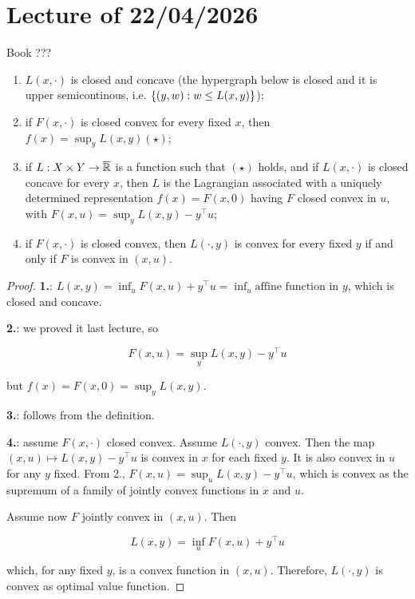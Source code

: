\chapter{Lecture \thechapter{} of 22/04/2026}

\begin{theorem}{Book ???}
    
    \begin{enumerate}
        \item $L(x,\cdot)$ is closed and concave (the hypergraph below is closed and it is upper semicontinous, i.e. $\left\{ (y,w) : w \le L(x,y) \right\}$);
        \item if $F(x,\cdot)$ is closed convex for every fixed $x$, then $f(x) = \sup_y L(x,y) (\star)$;
        \item if $L : X \times Y \to \overline{\mathbb{R}}$ is a function such that $(\star)$ holds, and if $L(x,\cdot)$ is closed concave for every $x$, then $L$ is the Lagrangian associated with a uniquely determined representation $f(x) = F(x,0)$ having $F$ closed convex in $u$, with $F(x,u) = \sup_y L(x,y) - y^\top u$;
        \item if $F(x,\cdot)$ is closed convex, then $L(\cdot,y)$ is convex for every fixed $y$ if and only if $F$ is convex in $(x,u)$.
    \end{enumerate}

\end{theorem}

\begin{proof}

    \textbf{1.}: $L(x,y) = \inf_u F(x,u) + y^\top u = \inf_u \text{affine function in }y$, which is closed and concave.
    
    \textbf{2.}: we proved it last lecture, so 

    \[ F(x,u) = \sup_y L(x,y) - y^\top u \]

    but $f(x) = F(x,0) = \sup_y L(x,y)$.

    \textbf{3.}: follows from the definition.

    \textbf{4.}: assume $F(x,\cdot)$ closed convex. Assume $L(\cdot,y)$ convex. Then the map $(x,u) \mapsto L(x,y) - y^\top u$ is convex in $x$ for each fixed $y$. It is also convex in $u$ for any $y$ fixed. From 2., $F(x,u) = \sup_u L(x,y) - y^\top u$, which is convex as the supremum of a family of jointly convex functions in $x$ and $u$.

    Assume now $F$ jointly convex in $(x,u)$. Then 

    \[ L(x,y) = \inf_u F(x,u) + y^\top u \]

    which, for any fixed $y$, is a convex function in $(x,u)$. Therefore, $L(\cdot,y)$ is convex as optimal value function.

\end{proof}

